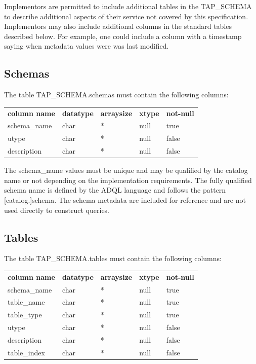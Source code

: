 \documentclass[11pt,letter]{ivoa}
\begin{document}
Implementors are permitted to include additional tables in the 
TAP\_SCHEMA to describe additional aspects of their service not 
covered by this specification. Implementors may also include additional columns 
in the standard tables described below. For example, one could include a column 
with a timestamp saying when metadata values were was last modified.

\subsection{Schemas}
\label{sec:tap-schema-schemas}

The table TAP\_SCHEMA.schemas must contain the following columns:

\begin{tabular}{l l l l l}
\label{tab:resources}
\textbf{column name} & \textbf{datatype} & \textbf{arraysize} & \textbf{xtype} & \textbf{not-null} \\
schema\_name & char & * & null & true \\
utype & char & * & null & false \\
description & char & * & null & false \\
\end{tabular}

The schema\_name values must be unique and may be qualified by the 
catalog name or not depending on the implementation requirements. The fully 
qualified schema name is defined by the ADQL language and  follows the pattern 
[catalog.]schema. The schema metadata are included for reference and are not 
used directly to construct queries.

\subsection{Tables}
\label{sec:tap-schema-tables}
The table TAP\_SCHEMA.tables must contain the following columns:

\begin{tabular}{l l l l l}
\label{tab:tap-schema-tables}
\textbf{column name} & \textbf{datatype} & \textbf{arraysize} & \textbf{xtype} & \textbf{not-null} \\
schema\_name & char & * & null & true \\
table\_name & char & * & null & true \\
table\_type & char & * & null & true \\
utype & char & * & null & false \\
description & char & * & null & false \\
table\_index & char & * & null & false \\
\end{tabular}
\end{document}
